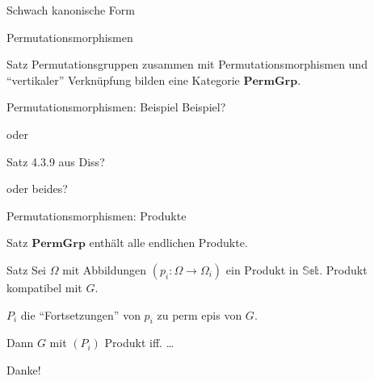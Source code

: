 
\begin{frame}{Schwach kanonische Form}

\end{frame}


\begin{frame}{Permutationsmorphismen}

\begin{block}{Satz}
Permutationsgruppen zusammen mit Permutationsmorphismen und ``vertikaler''
Verknüpfung bilden eine Kategorie $\mathbf{PermGrp}$.
\end{block}
\end{frame}

\begin{frame}{Permutationsmorphismen: Beispiel}
Beispiel?

oder

Satz 4.3.9 aus Diss?

oder beides?
\end{frame}


\begin{frame}{Permutationsmorphismen: Produkte}
\begin{block}{Satz}
$\mathbf{PermGrp}$ enthält alle endlichen Produkte.
\end{block}

\begin{block}{Satz}
Sei $\Omega$ mit Abbildungen $(p_i : \Omega \to \Omega_i)$ ein Produkt in
$\mathbb{Set}$.
Produkt kompatibel mit $G$.

$P_i$ die ``Fortsetzungen'' von $p_i$ zu perm epis von $G$.

Dann $G$ mit $(P_i)$ Produkt iff. \ldots
\end{block}
\end{frame}

\begin{frame}[standout]
Danke!
\end{frame}
